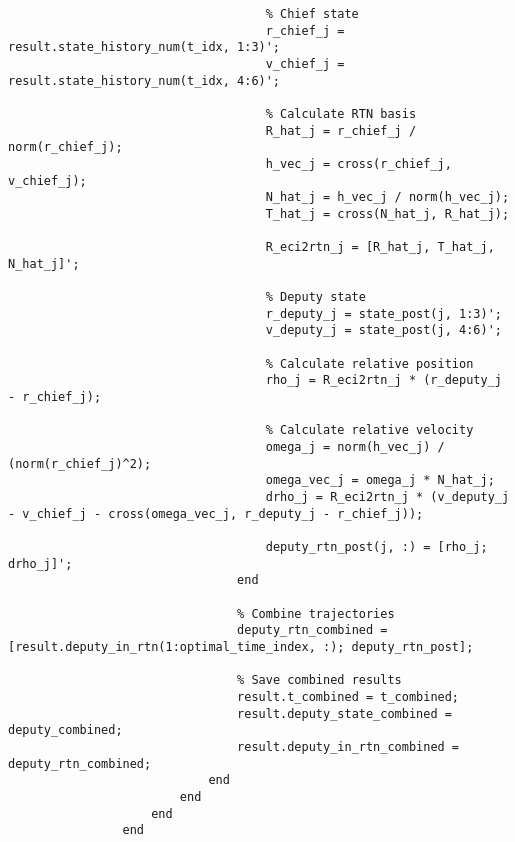 \begin{lstlisting}
                                    % Chief state
                                    r_chief_j = result.state_history_num(t_idx, 1:3)';
                                    v_chief_j = result.state_history_num(t_idx, 4:6)';
                                    
                                    % Calculate RTN basis
                                    R_hat_j = r_chief_j / norm(r_chief_j);
                                    h_vec_j = cross(r_chief_j, v_chief_j);
                                    N_hat_j = h_vec_j / norm(h_vec_j);
                                    T_hat_j = cross(N_hat_j, R_hat_j);
                                    
                                    R_eci2rtn_j = [R_hat_j, T_hat_j, N_hat_j]';
                                    
                                    % Deputy state
                                    r_deputy_j = state_post(j, 1:3)';
                                    v_deputy_j = state_post(j, 4:6)';
                                    
                                    % Calculate relative position
                                    rho_j = R_eci2rtn_j * (r_deputy_j - r_chief_j);
                                    
                                    % Calculate relative velocity
                                    omega_j = norm(h_vec_j) / (norm(r_chief_j)^2);
                                    omega_vec_j = omega_j * N_hat_j;
                                    drho_j = R_eci2rtn_j * (v_deputy_j - v_chief_j - cross(omega_vec_j, r_deputy_j - r_chief_j));
                                    
                                    deputy_rtn_post(j, :) = [rho_j; drho_j]';
                                end
                                
                                % Combine trajectories
                                deputy_rtn_combined = [result.deputy_in_rtn(1:optimal_time_index, :); deputy_rtn_post];
                                
                                % Save combined results
                                result.t_combined = t_combined;
                                result.deputy_state_combined = deputy_combined;
                                result.deputy_in_rtn_combined = deputy_rtn_combined;
                            end
                        end
                    end
                end


\end{lstlisting}
